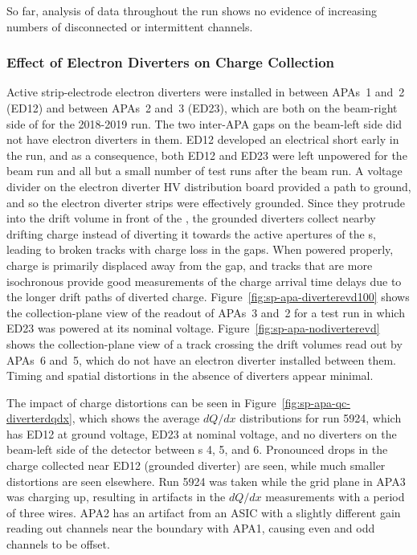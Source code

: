 So far, analysis of data throughout the  run shows no evidence of increasing numbers of disconnected or intermittent channels.


\subsubsection{Effect of Electron Diverters on Charge Collection}
\label{sec:fdsp-apa-qa-protodune-ops-electron-diverters-charge}

Active strip-electrode electron diverters were installed in  between APAs~1 and~2 (ED12) 
and between APAs~2 and~3 (ED23), which are both on the beam-right side of  for 
the 2018-2019 run.  The two inter-APA gaps on the beam-left side did not have electron diverters in them. ED12 developed an electrical short early in the run, and as a consequence, both ED12 and ED23 were left unpowered for the beam run and all but a small number of test runs after the beam run.  A voltage divider on the electron diverter HV distribution board provided a path to ground, and so the electron diverter strips were effectively grounded.  Since they protrude into the drift volume in front of the , the grounded diverters collect nearby drifting charge instead of diverting it towards the active apertures of the s, %
leading to broken tracks with charge loss in the gaps.  When powered properly, charge is primarily displaced away from the gap, and tracks that are more isochronous provide good measurements of the charge arrival time delays due to the longer drift paths of diverted charge. Figure~\ref{fig:sp-apa-diverterevd100} shows the collection-plane view of the readout of APAs~3 and~2 for a test run in which ED23 was powered at its nominal voltage. Figure~\ref{fig:sp-apa-nodiverterevd} shows the collection-plane view of a track crossing the drift volumes read out by APAs~6 and~5, which do not have an electron diverter installed between them.  Timing and spatial distortions in the absence of diverters appear minimal.

The impact of charge distortions can be seen in Figure~\ref{fig:sp-apa-qc-diverterdqdx}, which shows the average $dQ/dx$ distributions for  run 5924, which has ED12 at ground voltage, ED23 at nominal voltage, and no diverters on the beam-left side of the detector between s 4, 5, and 6.  Pronounced drops in the charge collected near ED12 (grounded diverter) are seen, while much smaller distortions are seen elsewhere.  Run 5924 was taken while the grid plane in APA3 was charging up, resulting in artifacts in the $dQ/dx$ measurements with a period of three wires.  APA2 has an artifact from an ASIC with a slightly different gain reading out channels near the boundary with APA1, causing even and odd channels to be offset.

